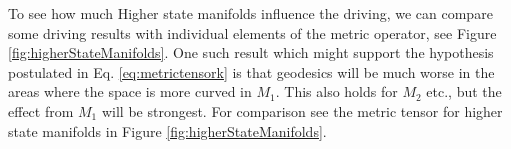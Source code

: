 \begin{figure}[H]
    \centering
\end{figure}

To see how much Higher state manifolds influence the driving, we can compare some driving results with individual elements of the metric operator, see Figure \ref{fig:higherStateManifolds}. One such result which might support the hypothesis postulated in Eq. \ref{eq:metrictensork} is that geodesics will be much worse in the areas where the space is more curved in $M_1$. This also holds for $M_2$ etc., but the effect from $M_1$ will be strongest. For comparison see the metric tensor for higher state manifolds in Figure \ref{fig:higherStateManifolds}.

